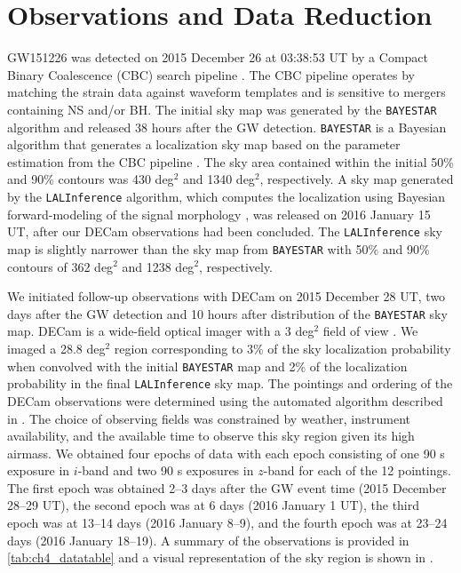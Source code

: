 \clearpage
\section{Observations and Data Reduction} 
\label{sec:ch4_obs}

GW151226 was detected on 2015 December 26 at 03:38:53 UT by a 
Compact Binary Coalescence (CBC) search pipeline \citep{LIGOGW151226}. The CBC
pipeline operates by matching the strain data against waveform
templates and is sensitive to mergers containing NS and/or BH. 
The initial sky map was generated by the {\tt BAYESTAR} algorithm
and released 38 hours after the GW detection. {\tt BAYESTAR} is a Bayesian 
algorithm that generates a localization sky map based on the parameter
estimation from the CBC pipeline \citep{Singer+14,SingerPrice16}. The sky area contained within the
initial 50\% and 90\% contours was 430 deg$^2$ and 1340 deg$^2$,
respectively. A sky map generated by the {\tt LALInference}
algorithm, which computes the localization using Bayesian forward-modeling 
of the signal morphology \citep{Veitch+15}, was released on 2016 January 15 UT, 
after our DECam observations had been concluded. The {\tt LALInference} sky map
is slightly narrower than the sky map from {\tt BAYESTAR} with 50\% and 90\% contours 
of 362 deg$^2$ and 1238 deg$^2$, respectively.

We initiated follow-up observations with DECam on 2015 December 28 UT,
two days after the GW detection and 10 hours after distribution of the {\tt BAYESTAR}
sky map. DECam is a wide-field optical imager with a 3 deg$^2$ field of view 
\citep{Flaugher+15}. We imaged a 28.8 deg$^2$ region corresponding to 3\%
of the sky localization probability when convolved with the initial {\tt BAYESTAR} map 
and 2\% of the localization probability in the final {\tt LALInference} sky map. 
The pointings and ordering of the DECam observations were determined using
the automated algorithm described in \citet{GW150914DECam}. The choice 
of observing fields was constrained by weather, instrument availability, and the available
time to observe this sky region given its high airmass. We
obtained four epochs of data with each epoch consisting of one 90 s
exposure in $i$-band and two 90 s exposures in $z$-band for each of the 12 pointings. The first
epoch was obtained 2--3 days after the GW event time (2015
December 28--29 UT), the second epoch was at 6 days (2016 January 1
UT), the third epoch was at 13--14 days (2016 January 8--9), and the
fourth epoch was at 23--24 days (2016 January 18--19). A summary of
the observations is provided in \cref{tab:ch4_datatable} and a visual
representation of the sky region is shown in
.

